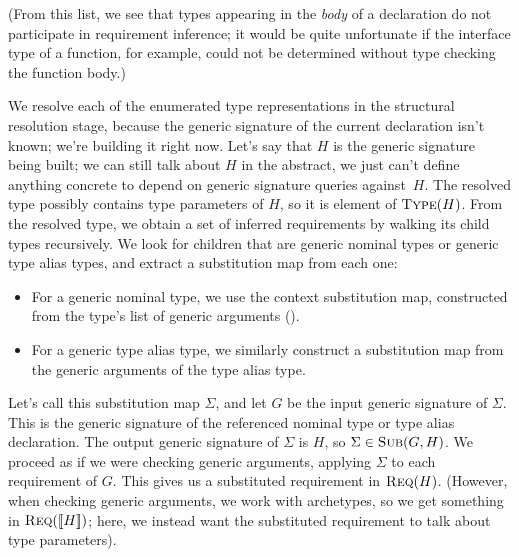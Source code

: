 \documentclass[../generics]{subfiles}
\begin{document}
(From this list, we see that types appearing in the \emph{body} of a declaration do not participate in requirement inference; it would be quite unfortunate if the interface type of a function, for example, could not be determined without type checking the function body.)

We resolve each of the enumerated type representations in the structural resolution stage, because the generic signature of the current declaration isn't known; we're building it right now. Let's say that $H$ is the generic signature being built; we can still talk about $H$ in the abstract, we just can't define anything concrete to depend on generic signature queries against~$H$. The resolved type possibly contains type parameters of $H$, so it is element of $\textsc{Type}({H})$. From the resolved type, we obtain a set of inferred requirements by walking its child types recursively. We look for children that are generic nominal types or generic type alias types, and extract a substitution map from each one:
\begin{itemize}
\item For a generic nominal type, we use the context substitution map, constructed from the type's list of generic arguments ().
\item For a generic type alias type, we similarly construct a substitution map from the generic arguments of the type alias type.
\end{itemize}
Let's call this substitution map $\Sigma$, and let $G$ be the input generic signature of $\Sigma$. This is the generic signature of the referenced nominal type or type alias declaration. The output generic signature of $\Sigma$ is $H$, so $\Sigma\in\textsc{Sub}({G, H})$. We proceed as if we were checking generic arguments, applying $\Sigma$ to each requirement of $G$. This gives us a substituted requirement in $\textsc{Req}({H})$. (However, when checking generic arguments, we work with archetypes, so we get something in $\textsc{Req}({[\![H]\!]})$; here, we instead want the substituted requirement to talk about type parameters).
\end{document}
